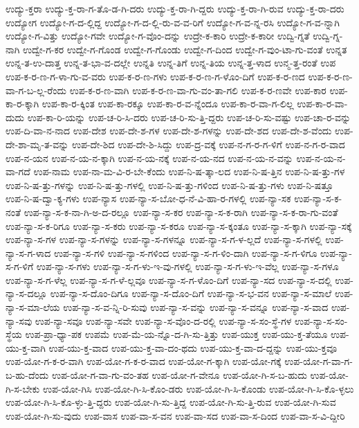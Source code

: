 {ಉದ್ಯು-ಕ್ತರಾ
ಉದ್ಯು-ಕ್ತ-ರಾ-ಗ-ತೊ-ಡ-ಗಿ-ದರು
ಉದ್ಯು-ಕ್ತ-ರಾ-ಗಿ-ದ್ದರು
ಉದ್ಯು-ಕ್ತ-ರಾ-ಗಿ-ರುವ
ಉದ್ಯು-ಕ್ತ-ರಾ-ದರು
ಉದ್ಯೋಗ
ಉದ್ಯೋ-ಗ-ದ-ಲ್ಲಿದ್ದ
ಉದ್ಯೋ-ಗ-ದ-ಲ್ಲಿ-ರು-ವ-ವ-ರಿಗೆ
ಉದ್ಯೋ-ಗ-ವ-ನ್ನ-ರಸಿ
ಉದ್ಯೋ-ಗ-ವ-ನ್ನಾಗಿ
ಉದ್ಯೋ-ಗ-ವಿತ್ತು
ಉದ್ಯೋ-ಗವೇ
ಉದ್ಯೋ-ಗ-ವೊಂ-ದನ್ನು
ಉದ್ರೇ-ಕ-ಕಾರಿ
ಉದ್ರೇ-ಕ-ಕಾರೀ
ಉದ್ವಿ-ಗ್ನತೆ
ಉದ್ವಿ-ಗ್ನ-ನಾಗಿ
ಉದ್ವೇ-ಗ-ಕರ
ಉದ್ವೇ-ಗ-ಗೊಂಡ
ಉದ್ವೇ-ಗ-ಗೊಂಡು
ಉದ್ವೇ-ಗ-ದಿಂದ
ಉದ್ವೇ-ಗ-ವುಂ-ಟಾ-ಗು-ವಂತೆ
ಉನ್ನತ
ಉನ್ನ-ತ-ಉ-ದಾತ್ತ
ಉನ್ನ-ತ-ಭಾ-ವ-ದಲ್ಲೇ
ಉನ್ನತಿ
ಉನ್ನ-ತಿಗೆ
ಉನ್ನ-ತಿಯ
ಉನ್ನ-ತ್ತ-ಳಾದ
ಉನ್ಮ-ತ್ತ-ರಂತೆ
ಉಪ
ಉಪ-ಕ-ರ-ಣ-ಗ-ಳಾ-ಗು-ವ-ವರು
ಉಪ-ಕ-ರ-ಣ-ಗಳು
ಉಪ-ಕ-ರ-ಣ-ಗ-ಳೊಂ-ದಿಗೆ
ಉಪ-ಕ-ರ-ಣದ
ಉಪ-ಕ-ರ-ಣ-ವಾ-ಗ-ಬ-ಲ್ಲ-ರೆಂದು
ಉಪ-ಕ-ರ-ಣ-ವಾಗಿ
ಉಪ-ಕ-ರ-ಣ-ವಾ-ಗು-ವಂ-ತಾ-ಗಲಿ
ಉಪ-ಕ-ರ-ಣವೇ
ಉಪ-ಕಾರ
ಉಪ-ಕಾ-ರ-ಕ್ಕಾಗಿ
ಉಪ-ಕಾ-ರ-ಕ್ಕಿಂತ
ಉಪ-ಕಾ-ರಕ್ಕೂ
ಉಪ-ಕಾ-ರ-ವ-ನ್ನೆಂದೂ
ಉಪ-ಕಾ-ರ-ವಾ-ಗ-ಲಿಲ್ಲ
ಉಪ-ಕಾ-ರ-ವಾ-ದುದು
ಉಪ-ಕಾ-ರಿ-ಯನ್ನು
ಉಪ-ಚ-ರಿ-ಸಿ-ದರು
ಉಪ-ಚ-ರಿ-ಸು-ತ್ತಿ-ದ್ದರು
ಉಪ-ಚ-ರಿ-ಸು-ವಷ್ಟು
ಉಪ-ಚಾ-ರ-ವನ್ನು
ಉಪ-ದಿ-ವಾ-ನ-ನಾದ
ಉಪ-ದೇಶ
ಉಪ-ದೇ-ಶ-ಗಳ
ಉಪ-ದೇ-ಶ-ಗಳನ್ನು
ಉಪ-ದೇ-ಶದ
ಉಪ-ದೇ-ಶ-ವೆಂದು
ಉಪ-ದೇ-ಶಾ-ಮೃ-ತ-ವನ್ನು
ಉಪ-ದೇ-ಶಿದ
ಉಪ-ದೇ-ಶಿ-ಸಿದ್ದು
ಉಪ-ದ್ರ-ವಕ್ಕೆ
ಉಪ-ನ-ಗ-ರ-ಗ-ಳಿಗೆ
ಉಪ-ನ-ಗ-ರ-ವಾದ
ಉಪ-ನ-ಯನ
ಉಪ-ನ-ಯ-ನ-ಕ್ಕಾಗಿ
ಉಪ-ನ-ಯ-ನಕ್ಕೆ
ಉಪ-ನ-ಯ-ನದ
ಉಪ-ನ-ಯ-ನ-ವನ್ನು
ಉಪ-ನ-ಯ-ನ-ವಾ-ಗದೆ
ಉಪ-ನಾಮ
ಉಪ-ನಾ-ಮ-ವಿ-ರ-ಬೇ-ಕೆಂದು
ಉಪ-ನಿ-ಷ-ತ್ಕಾ-ಲದ
ಉಪ-ನಿ-ಷ-ತ್ತಿನ
ಉಪ-ನಿ-ಷ-ತ್ತು-ಗಳ
ಉಪ-ನಿ-ಷ-ತ್ತು-ಗಳನ್ನು
ಉಪ-ನಿ-ಷ-ತ್ತು-ಗಳಲ್ಲಿ
ಉಪ-ನಿ-ಷ-ತ್ತು-ಗಳಿಂದ
ಉಪ-ನಿ-ಷ-ತ್ತು-ಗಳು
ಉಪ-ನಿ-ಷತ್ತೂ
ಉಪ-ನಿ-ಷ-ದ್ವಾ-ಕ್ಯ-ಗಳು
ಉಪ-ನ್ಯಾಸ
ಉಪ-ನ್ಯಾ-ಸ-ಬೋ-ಧ-ನೆ-ವಿ-ಹಾ-ರ-ಗಳಲ್ಲಿ
ಉಪ-ನ್ಯಾ-ಸಕ
ಉಪ-ನ್ಯಾ-ಸ-ಕ-ನಂತೆ
ಉಪ-ನ್ಯಾ-ಸ-ಕ-ನಾ-ಗಿ-ಅ-ದ-ರಲ್ಲೂ
ಉಪ-ನ್ಯಾ-ಸ-ಕರ
ಉಪ-ನ್ಯಾ-ಸ-ಕ-ರಾಗಿ
ಉಪ-ನ್ಯಾ-ಸ-ಕ-ರಾ-ಗು-ವಂತೆ
ಉಪ-ನ್ಯಾ-ಸ-ಕ-ರಿಗೂ
ಉಪ-ನ್ಯಾ-ಸ-ಕರು
ಉಪ-ನ್ಯಾ-ಸ-ಕರೂ
ಉಪ-ನ್ಯಾ-ಸ-ಕ್ಕಂತೂ
ಉಪ-ನ್ಯಾ-ಸ-ಕ್ಕಾಗಿ
ಉಪ-ನ್ಯಾ-ಸಕ್ಕೆ
ಉಪ-ನ್ಯಾ-ಸ-ಗಳ
ಉಪ-ನ್ಯಾ-ಸ-ಗಳನ್ನು
ಉಪ-ನ್ಯಾ-ಸ-ಗಳನ್ನೂ
ಉಪ-ನ್ಯಾ-ಸ-ಗ-ಳ-ಲ್ಲದೆ
ಉಪ-ನ್ಯಾ-ಸ-ಗಳಲ್ಲಿ
ಉಪ-ನ್ಯಾ-ಸ-ಗ-ಳಾದ
ಉಪ-ನ್ಯಾ-ಸ-ಗಳಿ
ಉಪ-ನ್ಯಾ-ಸ-ಗಳಿಂದ
ಉಪ-ನ್ಯಾ-ಸ-ಗ-ಳಿಂ-ದಾಗಿ
ಉಪ-ನ್ಯಾ-ಸ-ಗ-ಳಿಗೂ
ಉಪ-ನ್ಯಾ-ಸ-ಗ-ಳಿಗೆ
ಉಪ-ನ್ಯಾ-ಸ-ಗಳು
ಉಪ-ನ್ಯಾ-ಸ-ಗ-ಳು-ಇ-ವು-ಗಳಲ್ಲಿ
ಉಪ-ನ್ಯಾ-ಸ-ಗ-ಳು-ಇ-ವೆಲ್ಲ
ಉಪ-ನ್ಯಾ-ಸ-ಗಳೂ
ಉಪ-ನ್ಯಾ-ಸ-ಗ-ಳೆಲ್ಲ
ಉಪ-ನ್ಯಾ-ಸ-ಗ-ಳೆ-ಲ್ಲವೂ
ಉಪ-ನ್ಯಾ-ಸ-ಗ-ಳೊಂ-ದಿಗೆ
ಉಪ-ನ್ಯಾ-ಸದ
ಉಪ-ನ್ಯಾ-ಸ-ದಲ್ಲಿ
ಉಪ-ನ್ಯಾ-ಸ-ದಲ್ಲೂ
ಉಪ-ನ್ಯಾ-ಸ-ದೊಂ-ದಿಗೂ
ಉಪ-ನ್ಯಾ-ಸ-ದೊಂ-ದಿಗೆ
ಉಪ-ನ್ಯಾ-ಸ-ಭ-ವನ
ಉಪ-ನ್ಯಾ-ಸ-ಮಾಲೆ
ಉಪ-ನ್ಯಾ-ಸ-ಮಾ-ಲೆಯ
ಉಪ-ನ್ಯಾ-ಸ-ವ-ನ್ನಿ-ರಿ-ಸುವು
ಉಪ-ನ್ಯಾ-ಸ-ವನ್ನು
ಉಪ-ನ್ಯಾ-ಸ-ವನ್ನೂ
ಉಪ-ನ್ಯಾ-ಸ-ವಾದ
ಉಪ-ನ್ಯಾ-ಸವು
ಉಪ-ನ್ಯಾ-ಸವೂ
ಉಪ-ನ್ಯಾ-ಸವೇ
ಉಪ-ನ್ಯಾ-ಸ-ವೊಂ-ದ-ರಲ್ಲಿ
ಉಪ-ನ್ಯಾ-ಸ-ಸಂ-ಸ್ಥೆ-ಗಳ
ಉಪ-ನ್ಯಾ-ಸ-ಸಂ-ಸ್ಥೆಯ
ಉಪ-ಪ್ರಾ-ಧ್ಯಾ-ಪಕ
ಉಪಮೆ
ಉಪ-ಮೆ-ಯ-ನ್ನೊ-ದ-ಗಿ-ಸು-ತ್ತಿತ್ತು
ಉಪ-ಯುಕ್ತ
ಉಪ-ಯು-ಕ್ತ-ತೆಯೂ
ಉಪ-ಯು-ಕ್ತ-ವಾಗಿ
ಉಪ-ಯು-ಕ್ತ-ವಾದ
ಉಪ-ಯು-ಕ್ತ-ವಾ-ದಂ-ಥದು
ಉಪ-ಯು-ಕ್ತ-ವಾ-ದ-ದ್ದನ್ನು
ಉಪ-ಯು-ಕ್ತವೂ
ಉಪ-ಯೋ-ಗ-ಕ-ರ-ವಾಗಿ
ಉಪ-ಯೋ-ಗ-ಕ-ರ-ವಾದ
ಉಪ-ಯೋ-ಗ-ಕ್ಕಾಗಿ
ಉಪ-ಯೋ-ಗಕ್ಕೆ
ಉಪ-ಯೋ-ಗ-ವಾ-ಗ-ಬ-ಹು-ದೆಂದು
ಉಪ-ಯೋ-ಗ-ವಾ-ಗು-ವಂ-ತಹ
ಉಪ-ಯೋ-ಗ-ವೇನೂ
ಉಪ-ಯೋ-ಗಿ-ಸ-ಬ-ಹುದು
ಉಪ-ಯೋ-ಗಿ-ಸ-ಬೇಕು
ಉಪ-ಯೋ-ಗಿಸಿ
ಉಪ-ಯೋ-ಗಿ-ಸಿ-ಕೊಂ-ಡರು
ಉಪ-ಯೋ-ಗಿ-ಸಿ-ಕೊಂಡು
ಉಪ-ಯೋ-ಗಿ-ಸಿ-ಕೊ-ಳ್ಳಲು
ಉಪ-ಯೋ-ಗಿ-ಸಿ-ಕೊ-ಳ್ಳು-ತ್ತಿ-ದ್ದರು
ಉಪ-ಯೋ-ಗಿ-ಸು-ತ್ತಿದ್ದ
ಉಪ-ಯೋ-ಗಿ-ಸು-ತ್ತಿ-ರುವ
ಉಪ-ಯೋ-ಗಿ-ಸುವ
ಉಪ-ಯೋ-ಗಿ-ಸು-ವುದು
ಉಪ-ವಾಸ
ಉಪ-ವಾ-ಸ-ವನ
ಉಪ-ವಾ-ಸದ
ಉಪ-ವಾ-ಸ-ದಿಂದ
ಉಪ-ವಾ-ಸ-ವಿ-ದ್ದೀರಿ
}
